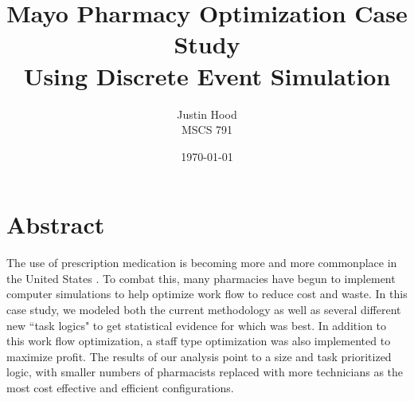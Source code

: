 \documentclass[10pt]{report}            %
\title{\huge\bf Mayo Pharmacy Optimization Case Study\\
\large Using Discrete Event Simulation}  %
\author{Justin Hood\\
MSCS 791}              %
\date{\today}                           %
\begin{document}
\maketitle                              %
\setcounter{page}{2}                    %
\newpage
\section*{Abstract}
The use of prescription medication is becoming more and more commonplace in the United States \cite{georgetown}. To combat this, many pharmacies have begun to implement computer simulations to help optimize work flow to reduce cost and waste. In this case study, we modeled both the current methodology as well as several different new ``task logics" to get statistical evidence for which was best. In addition to this work flow optimization, a staff type optimization was also implemented to maximize profit. The results of our analysis point to a size and task prioritized logic, with smaller numbers of pharmacists replaced with more technicians as the most cost effective and efficient configurations.
\newpage
\end{document}
